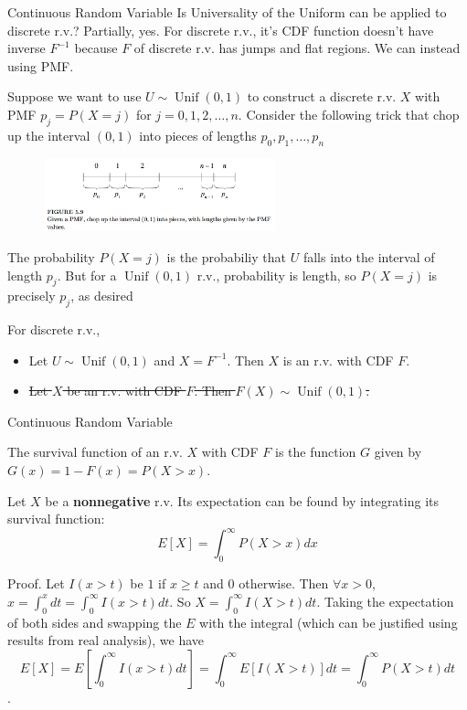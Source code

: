 \documentclass[8pt]{beamer}
\newcommand{\myunif}[2]{\operatorname{Unif}\!\left(#1, #2\right)}
\begin{document}
\begin{frame}{Continuous Random Variable}
    Is Universality of the Uniform can be applied to discrete r.v.? Partially, yes.
    For discrete r.v., it's CDF function doesn't have inverse $F^{-1}$ because $F$ of discrete r.v. has jumps and flat regions. We can instead using PMF.

    Suppose we want to use $U \sim \myunif{0}{1}$ to construct a discrete r.v. $X$ with PMF $p_j = P(X=j)$ for $j=0,1,2,\dots,n$.
    Consider the following trick that chop up the interval $(0,1)$ into pieces of lengths $p_0, p_1, \dots, p_n$
    
    \begin{figure}
        \centering
        \includegraphics[width=0.6\textwidth]{fig3.png}
    \end{figure}

    The probability $P(X=j)$ is the probabiliy that $U$ falls into the interval of length $p_j$. But for a $\myunif{0}{1}$ r.v., probability is length, so $P(X=j)$ is precisely $p_j$, as desired

\bigskip
    For discrete r.v.,
    \begin{itemize}
        \item Let $U \sim \myunif{0}{1}$ and $X = F^{-1}$. Then $X$ is an r.v. with CDF $F$.
        \item \sout{Let $X$ be an r.v. with CDF $F$. Then $F(X) \sim \myunif{0}{1}$.}
    \end{itemize}


\end{frame}

\begin{frame}{Continuous Random Variable}
    \begin{definition}
        The survival function of an r.v. $X$ with CDF $F$ is the function $G$ given by $G(x) = 1 - F(x) = P(X>x)$.
    \end{definition}
    \begin{theorem}
        Let $X$ be a \textbf{nonnegative} r.v. Its expectation can be found by integrating its survival function:
        \[
        E[X] = \int_0^\infty P(X>x)dx
        \]
    \end{theorem}

    Proof. Let $I(x>t)$ be $1$ if $x\geq t$ and $0$ otherwise. Then $\forall x > 0$, $x = \int_0^x dt = \int_0^\infty I(x>t) dt$. So $X = \int_0^\infty I(X>t) dt$. Taking the expectation of both sides and swapping the $E$ with the integral (which can be justified using results from real analysis), we have
    \[E[X] = E\left[\int_0^\infty I(x>t)dt \right] = \int_0^\infty E[I(X>t)]dt  = \int_0^\infty P(X>t)dt\].
\end{frame}
\end{document}
